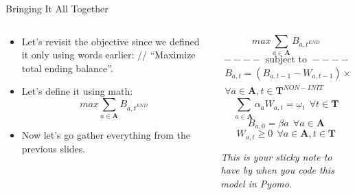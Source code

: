 \documentclass[10pt, aspectratio=169]{beamer}
\begin{document}
\begin{frame}{Bringing It All Together}
    \begin{columns}
        \begin{column}{0.5\textwidth}
            \begin{itemize}
                \item Let's revisit the objective since we defined it only using words earlier: // \enquote{Maximize total ending balance}.
                \item Let's define it using math:
                \pause
                $$max \sum_{a \in \textbf{A}} B_{a,t^{END}}$$
                \item Now let's go gather everything from the previous slides.
                \pause
            \end{itemize}
        \end{column}
        \begin{column}{0.5\textwidth}
            $$max \sum_{a \in \textbf{A}} B_{a,t^{END}}$$
            $$----\text{ subject to }----$$
            \begin{equation}
                \begin{split}
                B_{a,t} = \left(B_{a,t-1}-W_{a,t-1}\right) \times (1 + \delta_a) \\ \forall a \in \textbf{A}, t \in \textbf{T}^{NON-INIT}
                \end{split} \tag*{}
            \end{equation}
            $$\sum_{a \in \textbf{A}} \alpha_a W_{a,t} = \omega_t \ \ \forall t \in \textbf{T}$$
            $$B_{a,0} = \beta{a} \ \ \forall a \in \textbf{A}$$
            $$W_{a,t} \geq 0 \ \ \forall a \in \textbf{A}, t \in \textbf{T}$$
            \begin{center}
                \textit{This is your sticky note to have by when you code this model in Pyomo.}
            \end{center}
        \end{column}
    \end{columns}
\end{frame}
\end{document}
